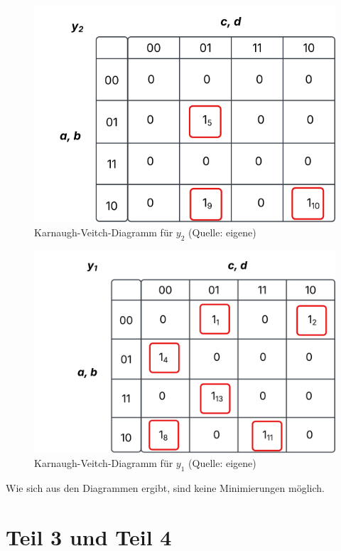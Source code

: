 \begin{figure}
    \centering
    \includegraphics[scale=0.5]{aufgabe 2/img/kv_y2}
    \caption{Karnaugh-Veitch-Diagramm für $y_2$ (Quelle: eigene)}
    \label{fig:kv_y2}
\end{figure}


\begin{figure}
    \centering
    \includegraphics[scale=0.5]{aufgabe 2/img/kv_y1.svg}
    \caption{Karnaugh-Veitch-Diagramm für $y_1$ (Quelle: eigene)}
    \label{fig:kv_y1}
\end{figure}

\noindent
Wie sich aus den Diagrammen ergibt, sind keine Minimierungen möglich.


\section{Teil 3 und Teil 4}

